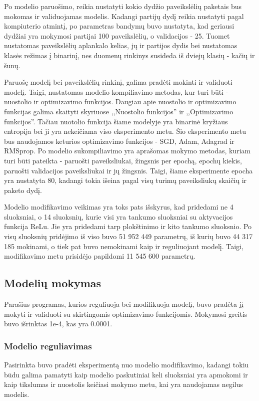\documentclass{VUMIFPSkursinis}
\begin{document}
Po modelio paruošimo, reikia nustatyti kokio dydžio paveikslėlių paketais bus mokomas ir validuojamas modelis. Kadangi partijų dydį reikia nustatyti pagal kompiuterio atmintį, 
po parametras bandymų buvo nustatyta, kad geriausi dydžiai yra mokymosi partijai 100 paveikslėlių, o validacijos - 25.
Tuomet nustatomas paveikslėlių aplankalo kelias, jų ir partijos dydis bei nustatomas klasės režimas į binarinį, nes duomenų rinkinys susideda iš dviejų klasių - kačių ir šunų.

Paruošę modelį bei paveikslėlių rinkinį, galima pradėti mokinti ir validuoti modelį. Taigi, nustatomas modelio kompiliavimo metodas, kur turi būti - nuostolio ir 
optimizavimo funkcijos. Daugiau apie nuostolio ir optimizavimo funkcijas galima skaityti skyriuose ,,Nuostolio funkcijos'' ir ,,Optimizavimo funkcijos''. Tačiau nuotolio 
funkcija šiame modelyje yra binarinė kryžiaus entropija bei ji yra nekeičiama viso eksperimento metu. Šio eksperimento metu bus naudojamos keturios optimizavimo funkcijos - SGD, 
Adam, Adagrad ir RMSprop. Po modelio sukompiliavimo yra aprašomas mokymo metodas, kuriam turi būti pateikta - paruošti paveiksliukai, žingsnis per epochą, epochų kiekis, 
paruošti validacijos paveiksliukai ir jų žingsnis. Taigi, šiame eksperimente epocha yra nustatyta 80, kadangi tokia išeina pagal visų turimų paveiksliukų skaičių ir paketo dydį.

Modelio modifikavimo veikimas yra toks pats išskyrus, kad pridedami ne 4 sluoksniai, o 14 sluoksnių, kurie visi yra tankumo sluoksniai su aktyvacijos funkcija ReLu. Jie yra 
pridedami tarp plokštinimo ir kito tankumo sluoksnio. Po visų sluoksnių pridėjimo iš viso buvo 51 952 449 parametrų, iš kurių buvo 44 317 185 mokinami, o tiek pat buvo nemokinami 
kaip ir reguliuojant modelį. Taigi, modifikavimo metu prisidėjo papildomi 11 545 600 parametrų.

\subsection{Modelių mokymas}
Parašius programas, kurios reguliuoja bei modifikuoja modelį, buvo pradėta jį mokyti ir validuoti su skirtingomis optimizavimo funkcijomis.
Mokymosi greitis buvo išrinktas 1e-4, kas yra 0.0001.
\subsubsection{Modelio reguliavimas}
Pasirinkta buvo pradėti eksperimentą nuo modelio modifikavimo, kadangi tokiu būdu galima pamatyti kaip modelio paskutiniai keli sluoksniai yra apmokomi ir kaip tikslumas ir nuostolis 
keičiasi mokymo metu, kai yra naudojamas negilus modelis.
\end{document}
